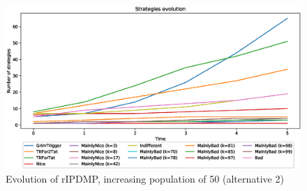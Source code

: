 \documentclass[journal,10pt,twoside]{IEEEtran}
\begin{document}
\begin{figure}
    \centering
    \includegraphics[width=.7\columnwidth]{../img/ripdmp-incr/alt2/ripdmp-evolution-increasing-pop-50}
    \caption{Evolution of rIPDMP, increasing population of 50 (alternative 2)}
    \label{fig:incrRa2}
\end{figure}



\end{document}
